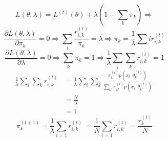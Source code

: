 \begin{equation}
L(\theta, \lambda) = L^{(t)}(\theta) + \lambda(1 - \sum_{k} \pi_k) \Rightarrow
\end{equation}
\begin{equation}
\frac{\partial L(\theta, \lambda)}{\partial \pi_k} = 0 \Rightarrow \sum_{i} \frac{r^{(t)}_{i,k}}{\pi_k} = \lambda \Rightarrow \pi_k = \frac{1}{\lambda} \sum{i} r^{(t)}_{i,k}
\end{equation}
\begin{equation}
\frac{\partial L(\theta, \lambda)}{\partial \lambda} = 0 \Rightarrow \sum_{k} \pi_k = 1 \Rightarrow \frac{1}{\lambda} \sum_{i} \sum_{k} r^{(t)}_{i,k} = 1
\end{equation}
\begin{align}
\frac{1}{\lambda} \sum_{i} \sum_{k} r^{(t)}_{i,k} &= \frac{1}{\lambda} \sum_{i} \sum_{k} \frac{\pi^{(t)}_k p(x_i; \theta^{(t)}_k)}{\sum_{k'} \pi^{(t)}_{k'} p(x_i; \theta^{(t)}_{k'})} \
\\
&= \frac{N}{\lambda} \
\\
&= 1 \
\end{align}
\begin{equation}
\pi_k^{(t+1)} = \frac{1}{\lambda} \sum_{i=1} r^{(t)}_{i,k} \
= \frac{1}{N} \sum_{i=1} r^{(t)}_{i,k} = \frac{r^{(t)}_{k}}{N}
\end{equation}
